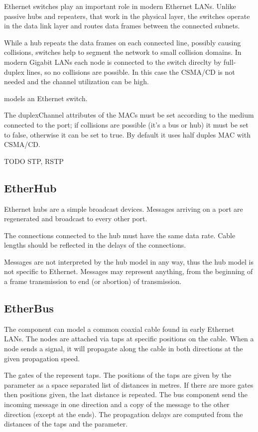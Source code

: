 Ethernet switches play an important role in modern Ethernet LANs. Unlike
passive hubs and repeaters, that work in the physical layer, the switches
operate in the data link layer and routes data frames between the connected
subnets.

While a hub repeats the data frames on each connected line, possibly causing
collisions, switches help to segment the network to small collision domains.
In modern Gigabit LANs each node is connected to the switch direclty
by full-duplex lines, so no collisions are possible. In this case the
CSMA/CD is not needed and the channel utilization can be high.

 models an Ethernet switch.

The duplexChannel attributes of the MACs must be set according to the
medium connected to the port; if collisions are possible (it's a bus or hub)
it must be set to false, otherwise it can be set to true.
By default it uses half duples MAC with CSMA/CD.

TODO STP, RSTP

\subsection{EtherHub}

Ethernet hubs are a simple broadcast devices. Messages arriving on a port
are regenerated and broadcast to every other port.

The connections connected to the hub must have the same data rate.
Cable lengths should be reflected in the delays of the connections.

Messages are not interpreted by the  hub model in any way,
thus the hub model is not specific to Ethernet. Messages may
represent anything, from the beginning of a frame transmission to
end (or abortion) of transmission.



\subsection{EtherBus}

The  component can model a common coaxial cable
found in early Ethernet LANs. The nodes are attached via taps at specific
positions on the cable. When a node sends a signal, it will propagate
along the cable in both directions at the given propagation speed.

The gates of the  represent taps. The positions
of the taps are given by the  parameter as a
space separated list of distances in metres. If there are more
gates then positions given, the last distance is repeated.
The bus component send the incoming message in one direction and
a copy of the message to the other direction (except at the ends).
The propagation delays are computed from the distances of the taps
and the  parameter.

